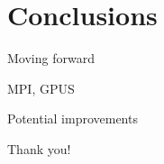 

\section{Conclusions}


    \begin{frame}{Moving forward}

        MPI, GPUS

        Potential improvements
        
    \end{frame}



    \begin{emptyframe}
        Thank you!
    \end{emptyframe}